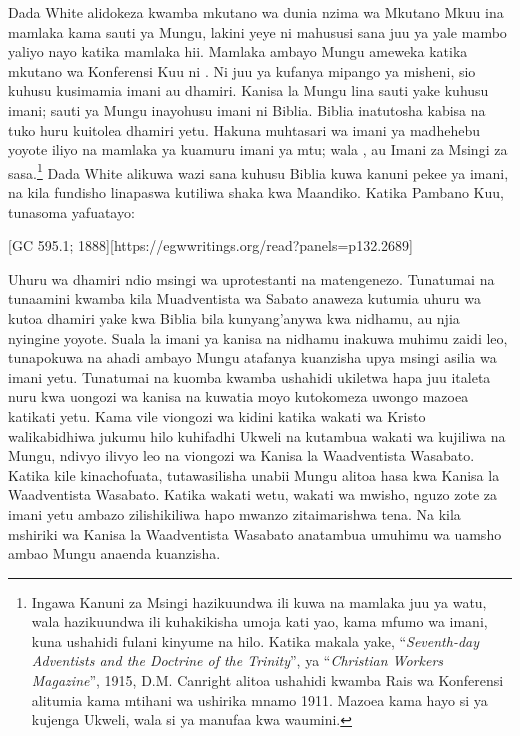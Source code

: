 Dada White alidokeza kwamba mkutano wa dunia nzima wa Mkutano Mkuu ina mamlaka kama sauti ya Mungu, lakini yeye ni mahususi sana juu ya yale mambo yaliyo nayo katika mamlaka hii. Mamlaka ambayo Mungu ameweka katika mkutano wa Konferensi Kuu ni . Ni juu ya kufanya mipango ya misheni, sio kuhusu kusimamia imani au dhamiri. Kanisa la Mungu lina sauti yake kuhusu imani; sauti ya Mungu inayohusu imani ni Biblia. Biblia inatutosha kabisa na tuko huru kuitolea dhamiri yetu. Hakuna muhtasari wa imani ya madhehebu yoyote iliyo na mamlaka ya kuamuru imani ya mtu; wala , au Imani za Msingi za sasa.\footnote{Ingawa Kanuni za Msingi hazikuundwa ili kuwa na mamlaka juu ya watu, wala hazikuundwa ili kuhakikisha umoja kati yao, kama mfumo wa imani, kuna ushahidi fulani kinyume na hilo. Katika makala yake, “\textit{Seventh-day Adventists and the Doctrine of the Trinity}”, ya “\textit{Christian Workers Magazine}”, 1915, D.M. Canright alitoa ushahidi kwamba Rais wa Konferensi alitumia  kama mtihani wa ushirika mnamo 1911. Mazoea kama hayo si ya kujenga Ukweli, wala si ya manufaa kwa waumini.} Dada White alikuwa wazi sana kuhusu Biblia kuwa kanuni pekee ya imani, na kila fundisho linapaswa kutiliwa shaka kwa Maandiko. Katika Pambano Kuu, tunasoma yafuatayo:

[GC 595.1; 1888][https://egwwritings.org/read?panels=p132.2689]

Uhuru wa dhamiri ndio msingi wa uprotestanti na matengenezo. Tunatumai na tunaamini kwamba kila Muadventista wa Sabato anaweza kutumia uhuru wa kutoa dhamiri yake kwa Biblia bila kunyang'anywa kwa nidhamu, au njia nyingine yoyote. Suala la imani ya kanisa na nidhamu inakuwa muhimu zaidi leo, tunapokuwa na ahadi ambayo Mungu atafanya kuanzisha upya msingi asilia wa imani yetu. Tunatumai na kuomba kwamba ushahidi ukiletwa hapa juu italeta nuru kwa uongozi wa kanisa na kuwatia moyo kutokomeza uwongo mazoea katikati yetu. Kama vile viongozi wa kidini katika wakati wa Kristo walikabidhiwa jukumu hilo kuhifadhi Ukweli na kutambua wakati wa kujiliwa na Mungu, ndivyo ilivyo leo na viongozi wa Kanisa la Waadventista Wasabato. Katika kile kinachofuata, tutawasilisha unabii Mungu alitoa hasa kwa Kanisa la Waadventista Wasabato. Katika wakati wetu, wakati wa mwisho, nguzo zote za imani yetu ambazo zilishikiliwa hapo mwanzo zitaimarishwa tena. Na kila mshiriki wa Kanisa la Waadventista Wasabato anatambua umuhimu wa uamsho ambao Mungu anaenda kuanzisha.


